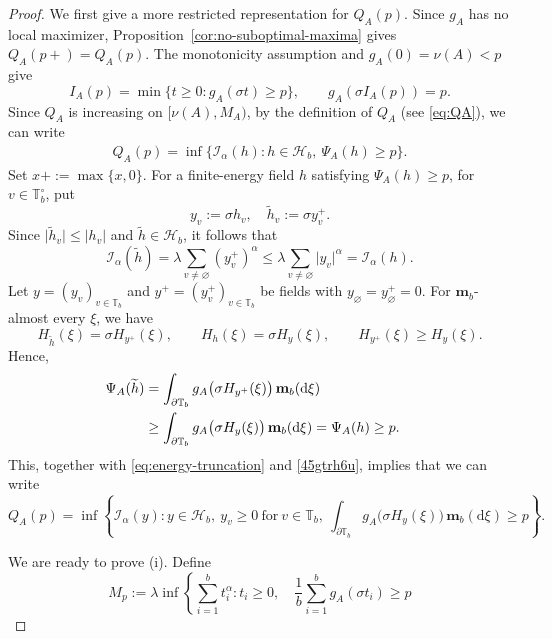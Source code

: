 \documentclass[10pt,a4paper]{amsart}
\begin{document}
\begin{proof}
We first give a more restricted representation for $Q_A(p)$. Since \(g_A\) has no local maximizer, Proposition~\ref{cor:no-suboptimal-maxima} gives $Q_A(p+)=Q_A(p).$ The monotonicity assumption and \(g_A(0)=\nu(A)<p\) give
\[
  I_A(p)=\min\{t\ge0:g_A(\sigma t)\ge p\},
  \qquad
  g_A(\sigma I_A(p))=p.
\]
Since $Q_A$ is increasing on $[\nu(A),M_A)$, by the definition of $Q_A$ (see \eqref{eq:QA}), we can write
\begin{align}\label{45gtrh6u}
  Q_A(p)=\inf\{\mathcal{I_{\alpha}}(h):h\in\mathcal{H}_b,\ \Psi_A(h)\ge p\}.
\end{align}
Set $x+:=\max\{x,0\}$. For a finite-energy field \(h\) satisfying \(\Psi_A(h)\ge p\), for ${v\in\mathbb{T}_b^{\circ}}$, put
\[
  y_v:=\sigma h_v,
  \quad
  \widetilde h_v:=\sigma y_v^+.
\]
Since \(\lvert\widetilde h_v\rvert\le\lvert h_v\rvert\) and
\(\widetilde h\in\mathcal{H}_b\), it follows that
\begin{equation}\label{eq:energy-truncation}
  \mathcal{I_{\alpha}}(\widetilde h)
  =\lambda\sum_{v\ne\varnothing}(y_v^+)^\alpha
  \le \lambda\sum_{v\ne\varnothing}\lvert y_v\rvert^\alpha
  =\mathcal{I_{\alpha}}(h).
\end{equation}
Let $y=(y_v)_{v\in\mathbb{T}_b}$ and $y^+=(y^+_v)_{v\in\mathbb{T}_b}$ be fields with $y_{\varnothing}=y^+_{\varnothing}=0$. For $\mathbf m_b$-almost every \(\xi\), we have
\[
  H_{\widetilde h}(\xi)=\sigma H_{y^+}(\xi),
  \qquad
  H_h(\xi)=\sigma H_y(\xi),
  \qquad
  H_{y^+}(\xi)\ge H_y(\xi).
\]
Hence,
\begin{align}
  \Psi_A(\widetilde h)
  &=\int_{\partial\mathbb{T}_b}g_A\bigl(\sigma H_{y^+}(\xi)\bigr)\,\mathbf m_b(\mathrm{d}\xi)\cr
  &\ge\int_{\partial\mathbb{T}_b}g_A\bigl(\sigma H_y(\xi)\bigr)\,\mathbf m_b(\mathrm{d}\xi)=\Psi_A(h)\ge p.\nonumber
\end{align}
This, together with \eqref{eq:energy-truncation} and \eqref{45gtrh6u}, implies that we can write
\begin{equation}\label{eq:positive-y}
 Q_A(p)=\inf\left\{\mathcal{I_{\alpha}}(y):y\in\mathcal{H}_b,~y_v\geq0\ \text{for}\ {v\in\mathbb{T}_b},\ \int_{\partial\mathbb{T}_b}g_A\bigl(\sigma H_{y}(\xi)\bigr)\,\mathbf m_b(\mathrm{d}\xi)\ge p\right\}.
\end{equation}
\par
 We are ready to prove (i). Define
\begin{equation}\label{eq:Mp}
  M_p:=\lambda\inf\left\{
      \sum_{i=1}^b t_i^\alpha:
      t_i\ge0,\quad
      \frac1b\sum_{i=1}^b g_A(\sigma t_i)\ge p

\end{equation}
\end{proof}
\end{document}
